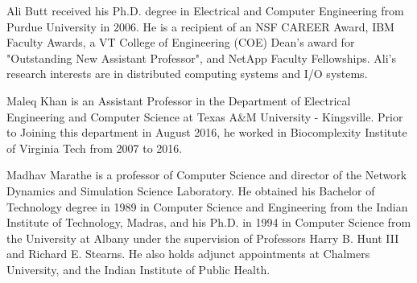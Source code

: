 \documentclass[10pt,journal,compsoc]{IEEEtran}
\begin{document}
\begin{IEEEbiography}{Ali Butt}
 received his Ph.D. degree in Electrical and Computer Engineering from Purdue
 University in 2006. He is a recipient of an NSF CAREER Award, IBM Faculty
 Awards, a VT College of Engineering (COE) Dean's award for "Outstanding New
 Assistant Professor", and NetApp Faculty Fellowships. Ali's research interests
 are in distributed computing systems and I/O systems.  \end{IEEEbiography}

\begin{IEEEbiography}{Maleq Khan}
 is an Assistant Professor in the Department of Electrical Engineering
and Computer Science at Texas A\&M University - Kingsville. Prior to Joining
this department in August 2016, he worked in Biocomplexity Institute of Virginia
Tech from 2007 to 2016.
\end{IEEEbiography}

\begin{IEEEbiography}{Madhav Marathe}
 is a professor of Computer Science and director of the Network
Dynamics and Simulation Science Laboratory. He obtained his Bachelor of
Technology degree in 1989 in Computer Science and Engineering from the Indian
Institute of Technology, Madras, and his Ph.D. in 1994 in Computer Science from
the University at Albany under the supervision of Professors Harry B. Hunt III
and Richard E. Stearns. He also holds adjunct appointments at Chalmers
University, and the Indian Institute of Public Health.
\end{IEEEbiography}
\end{document}
